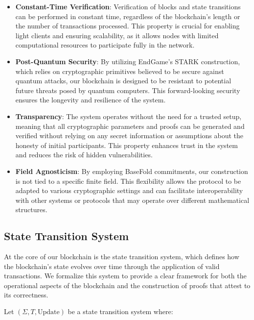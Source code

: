 \documentclass{article}
\theoremstyle{plain}
\theoremstyle{definition}
\theoremstyle{remark}
\theoremstyle{problem}
\begin{document}
\begin{itemize}
    \item \textbf{Constant-Time Verification}: Verification of blocks and state transitions can be performed in constant time, regardless of the blockchain's length or the number of transactions processed. This property is crucial for enabling light clients and ensuring scalability, as it allows nodes with limited computational resources to participate fully in the network.

    \item \textbf{Post-Quantum Security}: By utilizing EndGame's STARK construction, which relies on cryptographic primitives believed to be secure against quantum attacks, our blockchain is designed to be resistant to potential future threats posed by quantum computers. This forward-looking security ensures the longevity and resilience of the system.

    \item \textbf{Transparency}: The system operates without the need for a trusted setup, meaning that all cryptographic parameters and proofs can be generated and verified without relying on any secret information or assumptions about the honesty of initial participants. This property enhances trust in the system and reduces the risk of hidden vulnerabilities.

    \item \textbf{Field Agnosticism}: By employing BaseFold commitments, our construction is not tied to a specific finite field. This flexibility allows the protocol to be adapted to various cryptographic settings and can facilitate interoperability with other systems or protocols that may operate over different mathematical structures.
\end{itemize}
\subsection{State Transition System}

At the core of our blockchain is the state transition system, which defines how the blockchain's state evolves over time through the application of valid transactions. We formalize this system to provide a clear framework for both the operational aspects of the blockchain and the construction of proofs that attest to its correctness.

Let $(\Sigma, T, \text{Update})$ be a state transition system where:
\end{document}
